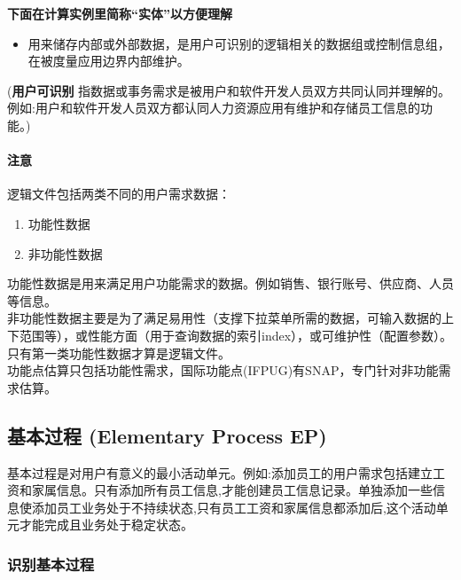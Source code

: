 \textbf{下面在计算实例里简称``实体''以方便理解}

\begin{itemize}
\tightlist
\item
  用来储存内部或外部数据，是用户可识别的逻辑相关的数据组或控制信息组，在被度量应用边界内部维护。
\end{itemize}

\begin{description}
\tightlist
\item[]
(\textbf{用户可识别}
指数据或事务需求是被用户和软件开发人员双方共同认同并理解的。
例如:用户和软件开发人员双方都认同人力资源应用有维护和存储员工信息的功能。)
\end{description}

\hypertarget{ux6ce8ux610f}{%
\paragraph{注意}\label{ux6ce8ux610f}}

逻辑文件包括两类不同的用户需求数据：

\begin{enumerate}
\tightlist
\item
  功能性数据
\item
  非功能性数据
\end{enumerate}

功能性数据是用来满足用户功能需求的数据。例如销售、银行账号、供应商、人员等信息。\\
非功能性数据主要是为了满足易用性（支撑下拉菜单所需的数据，可输入数据的上下范围等），或性能方面（用于查询数据的索引index），或可维护性（配置参数）。\\
只有第一类功能性数据才算是逻辑文件。\\
功能点估算只包括功能性需求，国际功能点(IFPUG)有SNAP，专门针对非功能需求估算。

\hypertarget{ux57faux672cux8fc7ux7a0b-elementary-process}{%
\subsection{基本过程 (Elementary
Process EP)}\label{ux57faux672cux8fc7ux7a0b-elementary-process}}

基本过程是对用户有意义的最小活动单元。例如:添加员工的用户需求包括建立工资和家属信息。只有添加所有员工信息,才能创建员工信息记录。单独添加一些信息使添加员工业务处于不持续状态,只有员工工资和家属信息都添加后,这个活动单元才能完成且业务处于稳定状态。

\hypertarget{ux8bc6ux522bux57faux672cux8fc7ux7a0b}{%
\subsubsection{识别基本过程}\label{ux8bc6ux522bux57faux672cux8fc7ux7a0b}}

